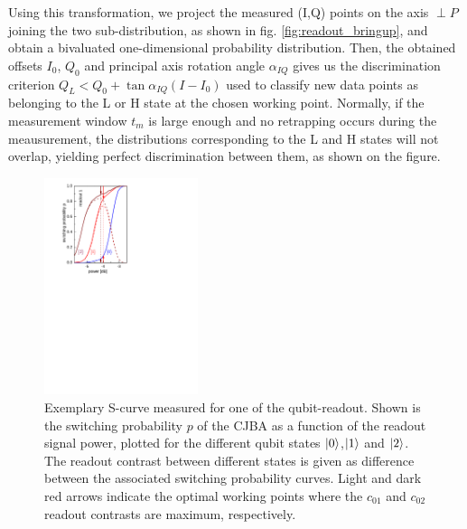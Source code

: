 %
Using this transformation, we project the measured (I,Q) points on the axis $\perp P$ joining the two sub-distribution, as shown in fig. \ref{fig:readout_bringup}, and obtain a bivaluated one-dimensional probability distribution. Then, the obtained offsets $I_0$, $Q_0$ and principal axis rotation angle $\alpha_{IQ}$ gives us the discrimination criterion $Q_L<Q_0+\tan{\alpha_{IQ}}(I-I_0)$ used to classify new data points as belonging to the L or H state at the chosen working point. Normally, if the measurement window $t_m$ is large enough and no retrapping occurs during the meausurement, the distributions corresponding to the L and H states will not overlap, yielding perfect discrimination between them, as shown on the figure.

\begin{figure}
\centering
\includegraphics[width=0.4\textwidth]{./material/papers/grover/figures/s_curves_example}
\caption{Exemplary S-curve measured for one of the qubit-readout. Shown is the switching probability $p$ of the CJBA as a function of the readout signal power, plotted for the different qubit states $\left| 0 \right>$,$\left| 1 \right>$ and $\left| 2 \right>$. The readout contrast between different states is given as difference between the associated switching probability curves. Light and dark red arrows indicate the optimal working points where the $c_{01}$ and $c_{02}$ readout contrasts are maximum, respectively.}
\label{fig:s_curves_example}
\end{figure}

\smallskip

